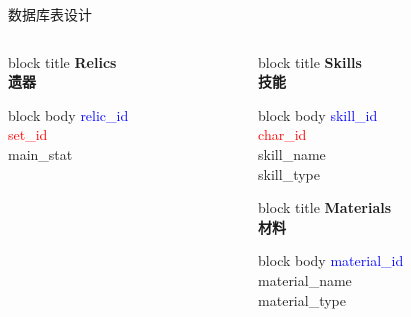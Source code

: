 \documentclass{beamer}
\begin{document}
\begin{frame}{数据库表设计}
\begin{columns}[T]
\begin{column}{0.25\textwidth}
            \vspace{0.5cm}
            
            \begin{beamercolorbox}[rounded=true,shadow=true]{block title}
                \centering\textbf{Relics \\遗器}
            \end{beamercolorbox}
            \begin{beamercolorbox}[rounded=true]{block body}
                \footnotesize
                \textcolor{blue}{relic\_id} \\
                \textcolor{red}{set\_id} \\
                main\_stat
            \end{beamercolorbox}
        \end{column}
        
        \begin{column}{0.25\textwidth}
            \begin{beamercolorbox}[rounded=true,shadow=true]{block title}
                \centering\textbf{Skills \\技能}
            \end{beamercolorbox}
            \begin{beamercolorbox}[rounded=true]{block body}
                \footnotesize
                \textcolor{blue}{skill\_id} \\
                \textcolor{red}{char\_id} \\
                skill\_name \\
                skill\_type
            \end{beamercolorbox}
            
            \vspace{0.5cm}
            
            \begin{beamercolorbox}[rounded=true,shadow=true]{block title}
                \centering\textbf{Materials \\材料}
            \end{beamercolorbox}
            \begin{beamercolorbox}[rounded=true]{block body}
                \footnotesize
                \textcolor{blue}{material\_id} \\
                material\_name \\
                material\_type
            \end{beamercolorbox}
        \end{column}
        

\end{columns}
\end{frame}
\end{document}
